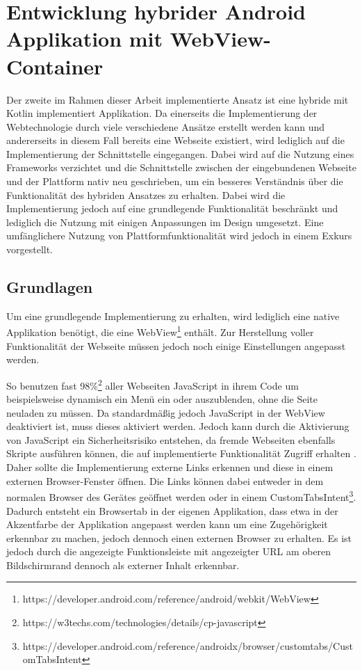 \section{Entwicklung hybrider Android Applikation mit WebView-Container}
Der zweite im Rahmen dieser Arbeit implementierte Ansatz ist eine hybride mit Kotlin implementiert Applikation. Da einerseits die Implementierung der Webtechnologie durch viele verschiedene Ansätze erstellt werden kann und andererseits in diesem Fall bereits eine Webseite existiert, wird lediglich auf die Implementierung der Schnittstelle eingegangen. Dabei wird auf die Nutzung eines Frameworks verzichtet und die Schnittstelle zwischen der eingebundenen Webseite und der Plattform nativ neu geschrieben, um ein besseres Verständnis über die Funktionalität des hybriden Ansatzes zu erhalten. Dabei wird die Implementierung jedoch auf eine grundlegende Funktionalität beschränkt und lediglich die Nutzung mit einigen Anpassungen im Design umgesetzt. Eine umfänglichere Nutzung von Plattformfunktionalität wird jedoch in einem Exkurs vorgestellt.

\subsection{Grundlagen}
Um eine grundlegende Implementierung zu erhalten, wird lediglich eine native Applikation benötigt, die eine WebView\footnote{https://developer.android.com/reference/android/webkit/WebView} enthält. Zur Herstellung voller Funktionalität der Webseite müssen jedoch noch einige Einstellungen angepasst werden.

So benutzen fast 98\%\footnote{https://w3techs.com/technologies/details/cp-javascript} aller Webseiten JavaScript in ihrem Code um beispielsweise dynamisch ein Menü ein oder auszublenden, ohne die Seite neuladen zu müssen. 
Da standardmäßig jedoch JavaScript in der WebView deaktiviert ist, muss dieses aktiviert werden. 
Jedoch kann durch die Aktivierung von JavaScript ein Sicherheitsrisiko entstehen, da  fremde Webseiten ebenfalls Skripte ausführen können, die auf implementierte Funktionalität Zugriff erhalten \cite{webview_javascript_security}. 
Daher sollte die Implementierung externe Links erkennen und diese in einem externen Browser-Fenster öffnen.
Die Links können dabei entweder in dem normalen Browser des Gerätes geöffnet werden oder in einem CustomTabsIntent\footnote{https://developer.android.com/reference/androidx/browser/customtabs/CustomTabsIntent}.
Dadurch entsteht ein Browsertab in der eigenen Applikation, dass etwa in der Akzentfarbe der Applikation angepasst werden kann um eine Zugehörigkeit erkennbar zu machen, jedoch dennoch einen externen Browser zu erhalten. Es ist jedoch durch die angezeigte Funktionsleiste mit angezeigter URL am oberen Bildschirmrand dennoch als externer Inhalt erkennbar.

